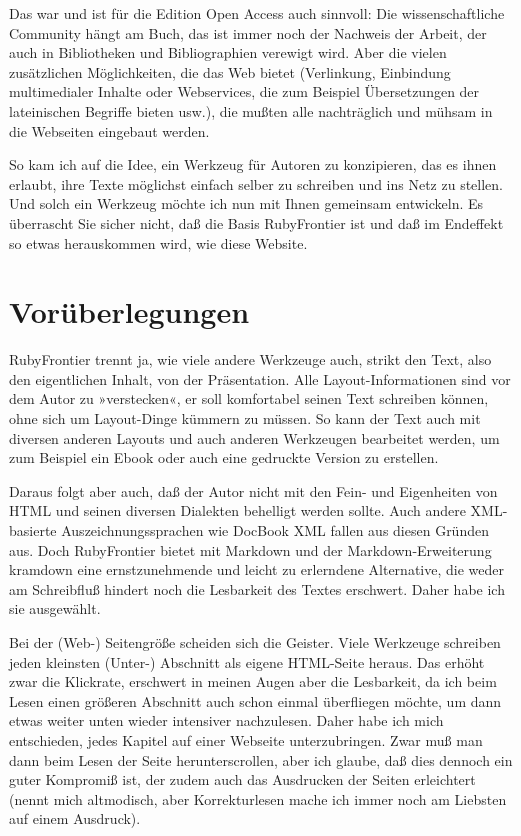 \documentclass[11pt]{report}
\begin{document}
Das war und ist für die Edition Open Access auch sinnvoll: Die
wissenschaftliche Community hängt am Buch, das ist immer noch der
Nachweis der Arbeit, der auch in Bibliotheken und Bibliographien
verewigt wird. Aber die vielen zusätzlichen Möglichkeiten, die das Web
bietet (Verlinkung, Einbindung multimedialer Inhalte oder Webservices,
die zum Beispiel Übersetzungen der lateinischen Begriffe bieten usw.),
die mußten alle nachträglich und mühsam in die Webseiten eingebaut
werden.


So kam ich auf die Idee, ein Werkzeug für Autoren zu konzipieren, das
es ihnen erlaubt, ihre Texte möglichst einfach selber zu schreiben und
ins Netz zu stellen. Und solch ein Werkzeug möchte ich nun mit Ihnen
gemeinsam entwickeln. Es überrascht Sie sicher nicht, daß die Basis
RubyFrontier ist und daß im Endeffekt so etwas herauskommen wird, wie
diese Website.
\section{Vorüberlegungen}
\label{sec-2-6-2}


RubyFrontier trennt ja, wie viele andere Werkzeuge auch, strikt den
Text, also den eigentlichen Inhalt, von der Präsentation. Alle
Layout-Informationen sind vor dem Autor zu »verstecken«, er soll
komfortabel seinen Text schreiben können, ohne sich um Layout-Dinge
kümmern zu müssen. So kann der Text auch mit diversen anderen Layouts
und auch anderen Werkzeugen bearbeitet werden, um zum Beispiel ein
Ebook oder auch eine gedruckte Version zu erstellen.


Daraus folgt aber auch, daß der Autor nicht mit den Fein- und
Eigenheiten von HTML und seinen diversen Dialekten behelligt werden
sollte. Auch andere XML-basierte Auszeichnungssprachen wie DocBook XML
fallen aus diesen Gründen aus. Doch RubyFrontier bietet mit Markdown
und der Markdown-Erweiterung kramdown eine ernstzunehmende und leicht
zu erlerndene Alternative, die weder am Schreibfluß hindert noch die
Lesbarkeit des Textes erschwert. Daher habe ich sie ausgewählt.


Bei der (Web-) Seitengröße scheiden sich die Geister. Viele Werkzeuge
schreiben jeden kleinsten (Unter-) Abschnitt als eigene HTML-Seite
heraus. Das erhöht zwar die Klickrate, erschwert in meinen Augen aber
die Lesbarkeit, da ich beim Lesen einen größeren Abschnitt auch schon
einmal überfliegen möchte, um dann etwas weiter unten wieder
intensiver nachzulesen. Daher habe ich mich entschieden, jedes Kapitel
auf einer Webseite unterzubringen. Zwar muß man dann beim Lesen der
Seite herunterscrollen, aber ich glaube, daß dies dennoch ein guter
Kompromiß ist, der zudem auch das Ausdrucken der Seiten erleichtert
(nennt mich altmodisch, aber Korrekturlesen mache ich immer noch am
Liebsten auf einem Ausdruck).
\end{document}

